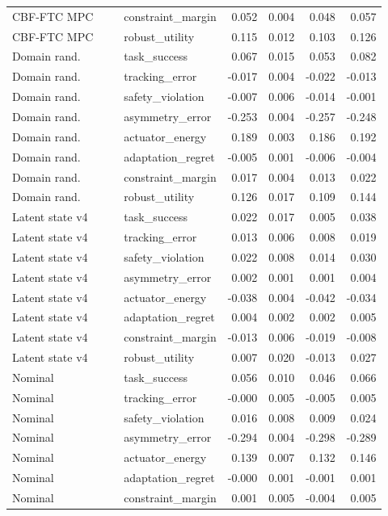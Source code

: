 \documentclass{article}
\begin{document}
\begin{center}
\begin{longtable}{p{0.31\linewidth}p{0.23\linewidth}rrrr}
CBF-FTC MPC & constraint\_margin & 0.052 & 0.004 & 0.048 & 0.057\\
CBF-FTC MPC & robust\_utility & 0.115 & 0.012 & 0.103 & 0.126\\
Domain rand. & task\_success & 0.067 & 0.015 & 0.053 & 0.082\\
Domain rand. & tracking\_error & -0.017 & 0.004 & -0.022 & -0.013\\
Domain rand. & safety\_violation & -0.007 & 0.006 & -0.014 & -0.001\\
Domain rand. & asymmetry\_error & -0.253 & 0.004 & -0.257 & -0.248\\
Domain rand. & actuator\_energy & 0.189 & 0.003 & 0.186 & 0.192\\
Domain rand. & adaptation\_regret & -0.005 & 0.001 & -0.006 & -0.004\\
Domain rand. & constraint\_margin & 0.017 & 0.004 & 0.013 & 0.022\\
Domain rand. & robust\_utility & 0.126 & 0.017 & 0.109 & 0.144\\
Latent state v4 & task\_success & 0.022 & 0.017 & 0.005 & 0.038\\
Latent state v4 & tracking\_error & 0.013 & 0.006 & 0.008 & 0.019\\
Latent state v4 & safety\_violation & 0.022 & 0.008 & 0.014 & 0.030\\
Latent state v4 & asymmetry\_error & 0.002 & 0.001 & 0.001 & 0.004\\
Latent state v4 & actuator\_energy & -0.038 & 0.004 & -0.042 & -0.034\\
Latent state v4 & adaptation\_regret & 0.004 & 0.002 & 0.002 & 0.005\\
Latent state v4 & constraint\_margin & -0.013 & 0.006 & -0.019 & -0.008\\
Latent state v4 & robust\_utility & 0.007 & 0.020 & -0.013 & 0.027\\
Nominal & task\_success & 0.056 & 0.010 & 0.046 & 0.066\\
Nominal & tracking\_error & -0.000 & 0.005 & -0.005 & 0.005\\
Nominal & safety\_violation & 0.016 & 0.008 & 0.009 & 0.024\\
Nominal & asymmetry\_error & -0.294 & 0.004 & -0.298 & -0.289\\
Nominal & actuator\_energy & 0.139 & 0.007 & 0.132 & 0.146\\
Nominal & adaptation\_regret & -0.000 & 0.001 & -0.001 & 0.001\\
Nominal & constraint\_margin & 0.001 & 0.005 & -0.004 & 0.005\\

\end{longtable}
\end{center}
\end{document}
